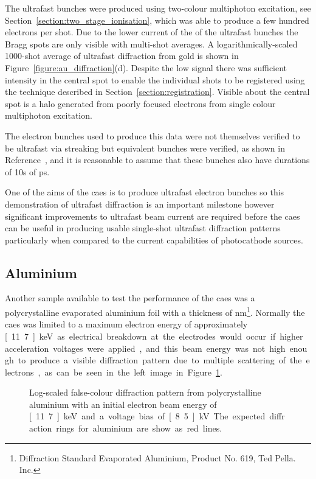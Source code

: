 The ultrafast bunches were produced using two-colour multiphoton excitation, see Section~\ref{section:two_stage_ionisation}, which was able to produce a few hundred electrons per shot.
Due to the lower current of the of the ultrafast bunches the Bragg spots are only visible with multi-shot averages.
A logarithmically-scaled 1000-shot average of ultrafast diffraction from gold is shown in Figure~\ref{figure:au_diffraction}(d).
Despite the low signal there was sufficient intensity in the central spot to enable the individual shots to be registered using the technique described in Section~\ref{section:registration}.
Visible about the central spot is a halo generated from poorly focused electrons from single colour multiphoton excitation.

The electron bunches used to produce this data were not themselves verified to be ultrafast via streaking but equivalent bunches were verified, as shown in Reference~\cite{speirs_identification_2017}, and it is reasonable to assume that these bunches also have durations of 10s of ps.

One of the aims of the \gls{caes} is to produce ultrafast electron bunches so this demonstration of ultrafast diffraction is an important milestone however significant improvements to ultrafast beam current are required before the \gls{caes} can be useful in producing usable single-shot ultrafast diffraction patterns particularly when compared to the current capabilities of photocathode sources.

\subsection{Aluminium}\label{section:aluminium_diffraction}

Another sample available to test the performance of the \gls{caes} was a polycrystalline evaporated aluminium foil with a thickness of \unit[31]{nm}\footnote{Diffraction Standard Evaporated Aluminium, Product No. 619, Ted Pella. Inc.}.
Normally the \gls{caes} was limited to a maximum electron energy of approximately \unit[11.7]{keV} as electrical breakdown at the electrodes would occur if higher acceleration voltages were applied, and this beam energy was not high enough to produce a visible diffraction pattern due to multiple scattering of the electrons, as can be seen in the left image in Figure~\ref{figure:al_diffraction}.

\begin{figure}
    \center
    
    \caption[Diffraction patterns from aluminium.]{Log-scaled false-colour diffraction pattern from polycrystalline aluminium with an initial electron beam energy of \unit[11.7]{keV} and a voltage bias of \unit[8.5]{kV}. The expected diffraction rings for aluminium are show as red lines.}
    \label{figure:al_diffraction}
\end{figure}

